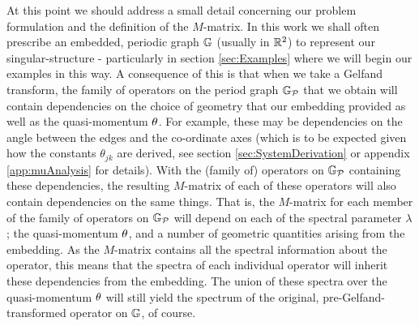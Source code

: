 At this point we should address a small detail concerning our problem formulation and the definition of the $M$-matrix.
In this work we shall often prescribe an embedded, periodic graph $\mathbb{G}$ (usually in $\mathbb{R}^2$) to represent our singular-structure - particularly in section \ref{sec:Examples} where we will begin our examples in this way.
A consequence of this is that when we take a Gelfand transform, the family of operators on the period graph $\mathbb{G}_{\mathcal{P}}$ that we obtain will contain dependencies on the choice of geometry that our embedding provided as well as the quasi-momentum $\theta$.
For example, these may be dependencies on the angle between the edges and the co-ordinate axes (which is to be expected given how the constants $\theta_{jk}$ are derived, see section \ref{sec:SystemDerivation} or appendix \ref{app:muAnalysis} for details).
With the (family of) operators on $\mathbb{G}_{\mathcal{P}}$ containing these dependencies, the resulting $M$-matrix of each of these operators will also contain dependencies on the same things.
That is, the $M$-matrix for each member of the family of operators on $\mathbb{G}_{\mathcal{P}}$ will depend on each of the spectral parameter $\lambda$; the quasi-momentum $\theta$, and a number of geometric quantities arising from the embedding.
As the $M$-matrix contains all the spectral information about the operator, this means that the spectra of each individual operator will inherit these dependencies from the embedding. 
The union of these spectra over the quasi-momentum $\theta$ will still yield the spectrum of the original, pre-Gelfand-transformed operator on $\mathbb{G}$, of course. \newline

